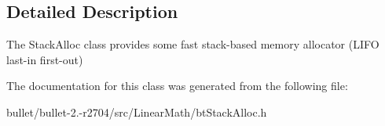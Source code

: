 \subsection{Detailed Description}
The Stack\+Alloc class provides some fast stack-\/based memory allocator (L\+I\+F\+O last-\/in first-\/out) 

The documentation for this class was generated from the following file\+:\begin{DoxyCompactItemize}
\item 
bullet/bullet-\/2.-\/r2704/src/\+Linear\+Math/bt\+Stack\+Alloc.\+h\end{DoxyCompactItemize}
